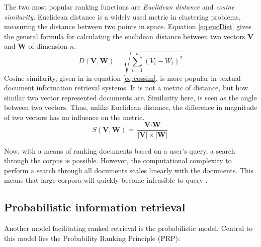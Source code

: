 \documentclass[twoside]{uva-inf-bachelor-thesis}
\begin{document}
The two most popular ranking functions are \textit{Euclidean distance} and \textit{cosine similarity}. Euclidean distance is a widely used metric in clustering problems, measuring the distance between two points in space. Equation \ref{eq:eucDist} gives the general formula for calculating the euclidean distance between two vectors $\textbf{V}$ and $\textbf{W}$ of dimension $n$. \cite{huang2008similarity}
\begin{equation}\label{eq:eucDist}
    D(\textbf{V}, \textbf{W}) = \sqrt{\sum_{i=1}^{n} (V_{i} - W_{i})^{2}}
\end{equation}
Cosine similarity, given in in equation \ref{eq:cossim}, is more popular in textual document information retrieval systems. It is not a metric of distance, but how similar two vector represented documents are. Similarity here, is seen as the angle between two vectors. Thus, unlike Euclidean distance, the difference in magnitude of two vectors has no influence on the metric. \cite{huang2008similarity, rahutomo2012semantic, manning08IR}
\begin{equation}\label{eq:cossim}
    S(\textbf{V}, \textbf{W}) = \frac{\textbf{V} \cdot \textbf{W}}{\lvert \textbf{V} \rvert \times \lvert \textbf{W} \rvert}
\end{equation}

Now, with a means of ranking documents based on a user's query, a search through the corpus is possible. However, the computational complexity to perform a search through all documents scales linearly with the documents. This means that large corpora will quickly become infeasible to query \cite{malkov2018efficient}.

\subsection{Probabilistic information retrieval}
Another model facilitating ranked retrieval is the probabilistic model. Central to this model lies the Probability Ranking Principle (PRP):

 \cite{robertson1977probability}
\end{document}
